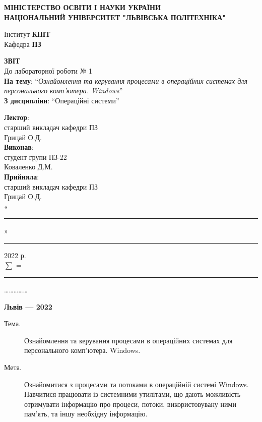 \documentclass{article}
\newcommand\subject{Операційні системи}
\newcommand\lecturer{старший викладач кафедри ПЗ\\Грицай О.Д.}
\newcommand\teacher{старший викладач кафедри ПЗ\\Грицай О.Д.}
\newcommand\mygroup{ПЗ-22}
\newcommand\lab{1}
\newcommand\theme{Ознайомлення та керування процесами в операційних системах для
	персонального комп’ютера. Windows}
\newcommand\purpose{Ознайомитися з процесами та потоками в операційній системі	Windows. Навчитися працювати із системними утилітами, що дають	можливість отримувати інформацію про процеси, потоки, використовувану ними пам'ять, та іншу необхідну інформацію}
\begin{document}
\begin{normalsize}
	\begin{titlepage}
		\thispagestyle{empty}
		\begin{center}
			\textbf{МІНІСТЕРСТВО ОСВІТИ І НАУКИ УКРАЇНИ\\
				НАЦІОНАЛЬНИЙ УНІВЕРСИТЕТ "ЛЬВІВСЬКА ПОЛІТЕХНІКА"}
		\end{center}
		\begin{flushright}
			Інститут \textbf{КНІТ}\\
			Кафедра \textbf{ПЗ}
		\end{flushright}
		\vspace{200pt}
		\begin{center}
			\textbf{ЗВІТ}\\
			\vspace{10pt}
			До лабораторної роботи № \lab\\
			\textbf{На тему}: “\textit{\theme}”\\
			\textbf{З дисципліни}: “\subject”
		\end{center}
		\vspace{112pt}
		\begin{flushright}
			
			\textbf{Лектор}:\\
			\lecturer\\
			\vspace{28pt}
			\textbf{Виконав}:\\
			
			студент групи \mygroup\\
			Коваленко Д.М.\\
			\vspace{28pt}
			\textbf{Прийняла}:\\
			
			\teacher\\
			
			\vspace{28pt}
			«\rule{1cm}{0.15mm}» \rule{1.5cm}{0.15mm} 2022 р.\\
			$\sum$ = \rule{1cm}{0.15mm}……………\\
			
		\end{flushright}
		\vspace{\fill}
		\begin{center}
			\textbf{Львів — 2022}
		\end{center}
	\end{titlepage}
		
	\begin{description}
		\item[Тема.] \theme.
		\item[Мета.] \purpose.
	\end{description}


\end{normalsize}
\end{document}
